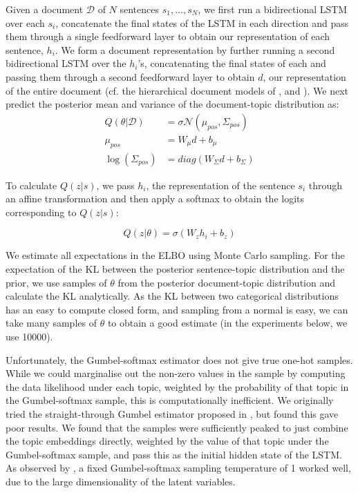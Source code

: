 Given a document $\mathcal{D}$ of $N$ sentences $s_1, \dots, s_N$, we first run a bidirectional LSTM over each $s_i$, concatenate the final states of the LSTM in each direction and pass them through a single feedforward layer to obtain our representation of each sentence, $h_i$. We form a document representation by further running a second bidirectional LSTM over the $h_i$'s, concatenating the final states of each and passing them through a second feedforward layer to obtain $d$, our representation of the entire document (cf. the hierarchical document models of \citet{Yang:16}, \citet{Li:2015} and \citet{Lin:15}). We next predict the posterior mean and variance of the document-topic distribution as:
\begin{equation}
\begin{split}
Q(\theta | \mathcal{D}) &= \sigma \mathcal{N}(\mu_{pos}, \Sigma_{pos}) \\
\mu_{pos} &= W_{\mu}d + b_{\mu} \\
\log(\Sigma_{pos}) &= diag(W_{\Sigma}d + b_{\Sigma})
\end{split}
\end{equation}

To calculate $Q(z|s)$, we pass $h_i$, the representation of the sentence $s_i$ through an affine transformation and then apply a softmax to obtain the logits corresponding to $Q(z|s)$:

\begin{equation}
Q(z | \theta) = \sigma(W_z h_i + b_z)
\end{equation}

We estimate all expectations in the ELBO using Monte Carlo sampling. For the expectation of the KL between the posterior sentence-topic distribution and the prior, we use samples of $\theta$ from the posterior document-topic distribution and calculate the KL analytically. As the KL between two categorical distributions has an easy to compute closed form, and sampling from a normal is easy, we can take many samples of $\theta$ to obtain a good estimate (in the experiments below, we use 10000).

Unfortunately, the Gumbel-softmax estimator does not give true one-hot samples. While we could marginalise out the non-zero values in the sample by computing the data likelihood under each topic, weighted by the probability of that topic in the Gumbel-softmax sample, this is computationally inefficient. We originally tried the straight-through Gumbel estimator proposed in \citet{Jang:17}, but found this gave poor results. We found that the samples were sufficiently peaked to just combine the topic embeddings directly, weighted by the value of that topic under the Gumbel-softmax sample, and pass this as the initial hidden state of the LSTM. As observed by \citet{Maddison:17}, a fixed Gumbel-softmax sampling temperature of 1 worked well, due to the large dimensionality of the latent variables.


